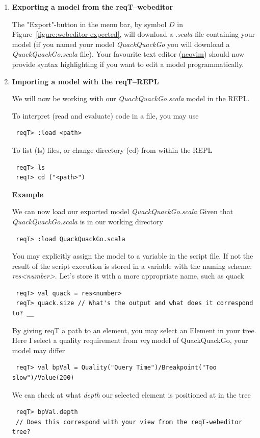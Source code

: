 \documentclass[11pt]{article}
\begin{document}
\begin{enumerate}
%
%
\item \textbf{Exporting a model from the reqT--webeditor}

The "Export"-button in the menu bar, by symbol $D$ in Figure~\ref{figure:webeditor-expected}, will download a \textit{.scala} file containing your model (if you named your model \textit{QuackQuackGo} you will download a \textit{QuackQuackGo.scala} file). Your favourite text editor (\href{https://neovim.io/}{neovim}) should now provide syntax highlighting if you want to edit a model programmatically.

%
%
\item \textbf{Importing a model with the reqT--REPL}

We will now be working with our \textit{QuackQuackGo.scala} model in the REPL.

\begin{framed}
\noindent To interpret (read and evaluate) code in a file, you may use
{
  \footnotesize\begin{verbatim}
 reqT> :load <path>
  \end{verbatim}
}
\noindent To list (ls) files, or change directory (cd) from within the REPL
{
  \footnotesize\begin{verbatim}
 reqT> ls
 reqT> cd ("<path>")
  \end{verbatim}
}
\noindent \textbf{Example}

\noindent We can now load our exported model \textit{QuackQuackGo.scala}
\noindent Given that \textit{QuackQuackGo.scala} is in our working directory
{
\footnotesize\begin{verbatim}
 reqT> :load QuackQuackGo.scala
\end{verbatim}
}
\noindent You may explicitly assign the model to a variable in the script file. If not the result of the script execution is stored in a variable with the naming scheme: \textit{res<number>}.
\noindent Let's store it with a more appropriate name, such as quack
{
\footnotesize\begin{verbatim}
 reqT> val quack = res<number>
 reqT> quack.size // What's the output and what does it correspond to? __
\end{verbatim}
}
\noindent By giving reqT a path to an element, you may select an Element in your tree.
\noindent Here I select a quality requirement from \textit{my} model of QuackQuackGo, your model may differ
{
\footnotesize\begin{verbatim}
 reqT> val bpVal = Quality("Query Time")/Breakpoint("Too slow")/Value(200)
\end{verbatim}
}
\noindent We can check at what \textit{depth} our selected element is positioned at in the tree
{
\footnotesize\begin{verbatim}
 reqT> bpVal.depth
 // Does this correspond with your view from the reqT-webeditor tree?
\end{verbatim}
}
\end{framed}


\end{enumerate}
\end{document}
